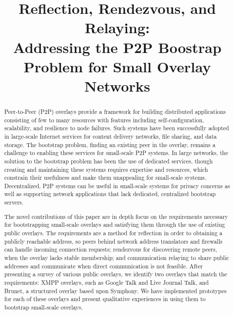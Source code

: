 \documentclass[conference]{IEEEtran}
\begin{document}
\title{Reflection, Rendezvous, and Relaying: \\
Addressing the P2P Boostrap Problem for Small Overlay Networks}

\author{
}

\maketitle

\begin{abstract}

Peer-to-Peer (P2P) overlays provide a framework for building distributed
applications consisting of few to many resources with features including
self-configuration, scalability, and resilience to node failures.  Such systems
have been successfully adopted in large-scale Internet services for content
delivery networks, file sharing, and data storage.  The bootstrap problem,
finding an existing peer in the overlay, remains a challenge to enabling these
services for small-scale P2P systems.  In large networks, the solution to the
bootstrap problem has been the use of dedicated services, though creating and
maintaining these systems requires expertise and resources, which constrain
their usefulness and make them unappealing for small-scale systems.
Decentralized, P2P systems can be useful in small-scale systems for privacy
concerns as well as supporting network applications that lack dedicated,
centralized bootstrap servers.

The novel contributions of this paper are in depth focus on the requirements
necessary for bootstrapping small-scale overlays and satisfying them through
the use of existing public overlays.  The requirements are a method for
reflection in order to obtaining a publicly reachable address, so peers behind
network address translators and firewalls can handle incoming connection
requests; rendezvous for discovering remote peers, when the overlay lacks
stable membership; and communication relaying to share public addresses and
communicate when direct communication is not feasible.  After presenting a
survey of various public overlays, we identify two overlays that match the
requirements:  XMPP overlays, such as Google Talk and Live Journal Talk, and
Brunet, a structured overlay based upon Symphony.  We have implemented
prototypes for each of these overlays and present qualitative experiences in
using them to bootstrap small-scale overlays.

\end{abstract}
\end{document}
